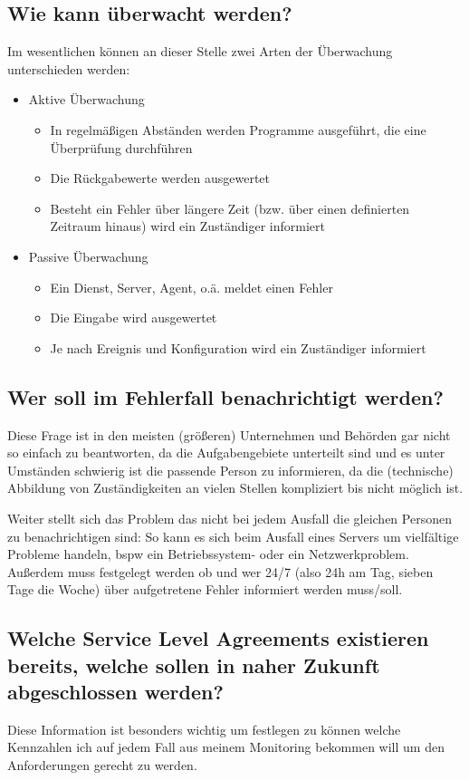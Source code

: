 \documentclass[12pt,a4paper,parskip,listof=totoc,bibliography=totoc]{scrreprt}
\begin{document}
	\subsection{Wie kann überwacht werden?}
	Im wesentlichen können an dieser Stelle zwei Arten der Überwachung unterschieden werden:
	\begin{itemize}
		\item Aktive Überwachung
		\begin{itemize}
		\item In regelmäßigen Abständen werden Programme ausgeführt, die eine Überprüfung durchführen
		\item Die Rückgabewerte werden ausgewertet
		\item Besteht ein Fehler über längere Zeit (bzw. über einen definierten Zeitraum hinaus) wird ein Zuständiger informiert
		\end{itemize}
		\item Passive Überwachung
		\begin{itemize}
			\item Ein Dienst, Server, Agent, o.ä. meldet einen Fehler
			\item Die Eingabe wird ausgewertet
			\item Je nach Ereignis und Konfiguration wird ein Zuständiger informiert
		\end{itemize}
	\end{itemize}
	\subsection{Wer soll im Fehlerfall benachrichtigt werden?}
	Diese Frage ist in den meisten (größeren) Unternehmen und Behörden gar nicht so einfach zu beantworten, da die Aufgabengebiete unterteilt sind und es unter Umständen schwierig ist die passende Person zu informieren, da die (technische) Abbildung von Zuständigkeiten an vielen Stellen kompliziert bis nicht möglich ist. 
	
	Weiter stellt sich das Problem das nicht bei jedem Ausfall die gleichen Personen zu benachrichtigen sind:
	So kann es sich beim Ausfall eines Servers um vielfältige Probleme handeln, \acrlong{bspw} ein Betriebssystem- oder ein Netzwerkproblem.
	Außerdem muss festgelegt werden ob und wer 24/7 (also 24h am Tag, sieben Tage die Woche) über aufgetretene Fehler informiert werden muss/soll.
	\subsection{Welche Service Level Agreements existieren bereits, welche sollen in naher Zukunft abgeschlossen werden?}
	Diese Information ist besonders wichtig um festlegen zu können welche Kennzahlen ich auf jedem Fall aus meinem Monitoring bekommen will um den Anforderungen gerecht zu werden.
\end{document}

